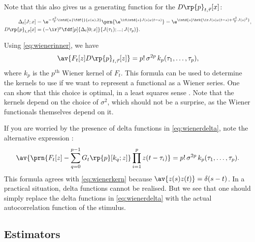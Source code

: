 \documentclass[12pt]{article}
\begin{document}
Note that this also gives us a generating function for the \( D\rp{p}_{t,\vec{\tau}}[x] \):
%
\begin{equation*}
\begin{aligned}
  \Delta_t[J;x] &= \e^{-\frac{\sigma^2}{2}\intd{u}\fdf{}{x(u),2}}
        \prn{ \e^{\ir\!\intd{s} J(s) x(t-s)} }
    = \e^{\intd{s}\brk{ \ir J(s) x(t-s) + \frac{\sigma^2}{2} J(s)^2}  }, \\
  D\rp{p}_{t,\vec{\tau}}[x]
    &= (-\ir)^p \fdf[p]{ \Delta_t[0;x] }{J(\tau_1);...;J(\tau_p)}.
\end{aligned}
\end{equation*}
%

Using \eqref{eq:wienerinner}, we have
%
\begin{equation}\label{eq:wienerkern}
  \av{F_t[z] D\rp{p}_{t,\vec{\tau}}[z]} = p!\,\sigma^{2p}\,k_p(\tau_1,\ldots,\tau_p),
\end{equation}
%
where $k_p$ is the $p^{\text{th}}$ Wiener kernel of $F_t$.
This formula can be used to determine the kernels to use if we want to represent a functional as a Wiener series.
One can show that this choice is optimal, in a least squares sense \cite[\S15.]{schetzen:1980}.
Note that the kernels depend on the choice of $\sigma^2$, which should not be a surprise, as the Wiener functionals themselves depend on it.

If you are worried by the presence of delta functions in \eqref{eq:wienerdelta}, note the alternative expression \cite{Lee1965}:
%
\begin{equation}\label{eq:wieneralt}
  \av{\prn{ F_t[z] - \sum_{q=0}^{p-1} G_t\rp{p}[k_q;z]} \prod_{i=1}^p z(t-\tau_i) } 
    = p!\,\sigma^{2p}\,k_p(\tau_1,\ldots,\tau_p).
\end{equation}
%
This formula agrees with \eqref{eq:wienerkern} because $\av{z(s)z(t)}=\delta(s-t)$.
In a practical situation, delta functions cannot be realised.
But we see that one should simply replace the delta functions in \eqref{eq:wienerdelta} with the actual autocorrelation function of the stimulus.


\subsection{Estimators}\label{sec:wienerest}
\end{document}
